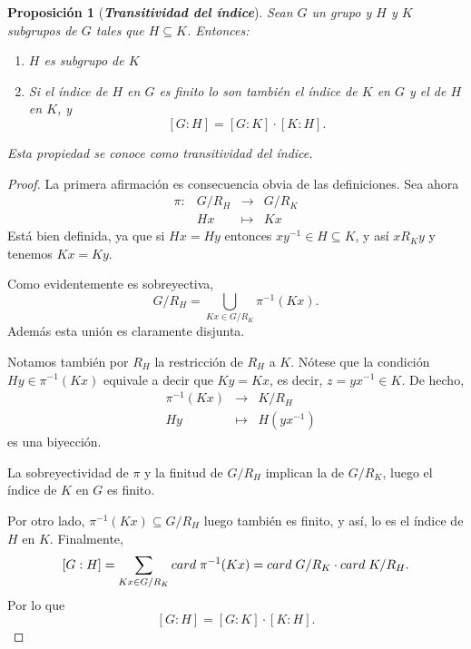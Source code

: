 \documentclass[12pt]{article}
\newtheorem{proposition}[theorem]{Proposición}
\begin{document}
\begin{proposition}[\textbf{\textit{Transitividad del índice}}]Sean $G$ un grupo y $H$ y $K$ subgrupos de $G$ tales que $H \subseteq K$. Entonces:
\begin{enumerate}
\item $H$ es subgrupo de $K$
\item Si el índice de $H$ en $G$ es finito lo son también el índice de $K$ en $G$ y el de $H$ en $K$, y $$\left[ G:H \right] = \left[ G:K \right]\cdot \left[ K:H \right].$$
\end{enumerate}
Esta propiedad se conoce como \textit{transitividad del índice.}
\end{proposition}
\begin{proof}
La primera afirmación es consecuencia obvia de las definiciones. Sea ahora $$
\begin{array}{rccl}
\pi \colon &G/R_H & \longrightarrow &G/R_K\\
&Hx & \longmapsto &Kx
\end{array}
$$
Está bien definida, ya que si $Hx = Hy$ entonces $xy^{-1} \in H \subseteq K$, y así $xR_Ky$ y tenemos $Kx = Ky$.

Como evidentemente es sobreyectiva, $$G/R_H = \bigcup_{Kx \in G/R_K}\pi^{-1}(Kx).$$ Además esta unión es claramente disjunta.

Notamos también por $R_H$ la restricción de $R_H$ a $K$. Nótese que la condición $Hy \in \pi^{-1}(Kx)$ equivale a decir que $Ky = Kx$, es decir, $z = yx^{-1} \in K$. De hecho, $$
\begin{array}{rccl}
&\pi^{-1}(Kx) & \longrightarrow &K/R_H\\
&Hy & \longmapsto &H(yx^{-1})
\end{array}
$$
es una biyección. 

La sobreyectividad de $\pi$ y la finitud de $G/R_H$ implican la de $G/R_K$, luego el índice de $K$ en $G$ es finito. 

Por otro lado, $\pi^{-1}(Kx) \subseteq G/R_H$ luego también es finito, y así, lo es el índice de $H$ en $K$. Finalmente, $$[G:H] = \sum_{Kx \in G/R_K} card \hspace{0.1cm}\pi^{-1}(Kx) = card\hspace{0.1cm} G/R_K \cdot card\hspace{0.1cm} K/R_H.$$ Por lo que $$[G:H] = [G:K] \cdot [K:H].$$

\end{proof}
\end{document}
